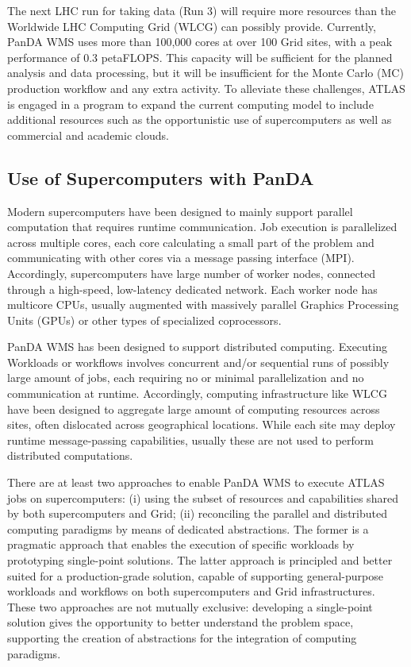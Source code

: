 The next LHC run for taking data (Run 3) will require more resources than the
Worldwide LHC Computing Grid (WLCG) can possibly provide. Currently, PanDA WMS
uses more than 100,000 cores at over 100 Grid sites, with a peak performance of
0.3 petaFLOPS. This capacity will be sufficient for the planned analysis and
data processing, but it will be insufficient for the Monte Carlo (MC) production
workflow and any extra activity. To alleviate these challenges, ATLAS is engaged
in a program to expand the current computing model to include additional
resources such as the opportunistic use of supercomputers as well as commercial
and academic clouds.

\subsection{Use of Supercomputers with PanDA}

Modern supercomputers have been designed to mainly support parallel computation
that requires runtime communication. Job execution is parallelized across
multiple cores, each core calculating a small part of the problem and
communicating with other cores via a message passing interface (MPI).
Accordingly, supercomputers have large number of worker nodes, connected through
a high-speed, low-latency dedicated network. Each worker node has multicore
CPUs, usually augmented with massively parallel Graphics Processing Units (GPUs)
or other types of specialized coprocessors.

PanDA WMS has been designed to support distributed computing. Executing
Workloads or workflows involves concurrent and/or sequential runs of possibly
large amount of jobs, each requiring no or minimal parallelization and no
communication at runtime. Accordingly, computing infrastructure like WLCG have
been designed to aggregate large amount of computing resources across sites,
often dislocated across geographical locations. While each site may deploy
runtime message-passing capabilities, usually these are not used to perform
distributed computations.

There are at least two approaches to enable PanDA WMS to execute ATLAS jobs on
supercomputers: (i) using the subset of resources and capabilities shared by
both supercomputers and Grid; (ii) reconciling the parallel and distributed
computing paradigms by means of dedicated abstractions. The former is a
pragmatic approach that enables the execution of specific workloads by
prototyping single-point solutions. The latter approach is principled and better
suited for a production-grade solution, capable of supporting general-purpose
workloads and workflows on both supercomputers and Grid infrastructures. These
two approaches are not mutually exclusive: developing a single-point solution
gives the opportunity to better understand the problem space, supporting the
creation of abstractions for the integration of computing paradigms.

